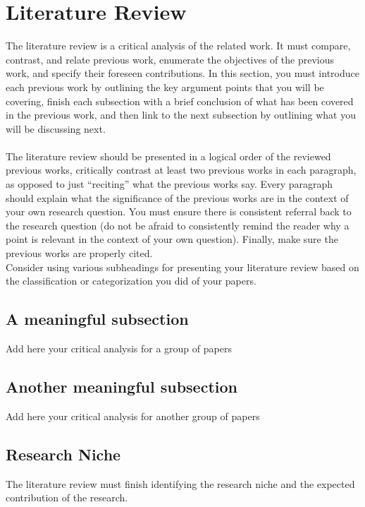 \documentclass[10pt]{article}
\begin{document}
\section{Literature Review} 

The literature review is a critical analysis of the related work. It must compare, contrast, and relate previous work, enumerate the objectives of the previous work, and specify their foreseen contributions. 
In this section, you must introduce each previous work by outlining the key argument points that you will be covering, finish each subsection with a brief conclusion of what has been covered in the previous work, and then link to the next subsection by outlining what you will be discussing next.
\\\\
The literature review should be presented in a logical order of the reviewed previous works, critically contrast at least two previous works in each paragraph, as opposed to just “reciting” what the previous works say.  Every paragraph should explain what the significance of the previous works are in the context of your own research question. You must ensure there is consistent referral back to the research question (do not be afraid to consistently remind the reader why a point is relevant in the context of your own question). Finally, make sure the previous works are properly cited.
\\
Consider using various subheadings for presenting your literature review based on the classification or categorization you did of your papers.

\subsection{A meaningful subsection}
Add here your critical analysis for a group of papers

\subsection{Another meaningful subsection}
Add here your critical analysis for another group of papers

\subsection{Research Niche}
The literature review must finish identifying the research niche and the expected contribution of the research.
\end{document}
